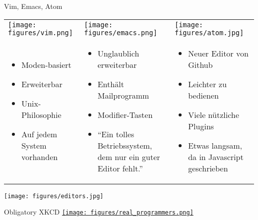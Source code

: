 \begin{frame}{Vim, Emacs, Atom}
  \begin{tabu}{@{} X[,C] @{} X[,C] @{} X[,C] @{}}
    \texttt{[image: figures/vim.png]} &
    \texttt{[image: figures/emacs.png]} &
    \texttt{[image: figures/atom.jpg]} \\
    \begin{itemize}
      \item Moden-basiert
      \item Erweiterbar
      \item Unix-Philosophie
      \item Auf jedem System vorhanden
    \end{itemize}
    &
    \begin{itemize}
      \item Unglaublich erweiterbar
      \item Enthält Mailprogramm
      \item Modifier-Tasten
      \item \enquote{Ein tolles Betriebssystem, dem nur ein guter Editor fehlt.}
    \end{itemize}
    &
    \begin{itemize}
      \item Neuer Editor von Github
      \item Leichter zu bedienen
      \item Viele nützliche Plugins
      \item Etwas langsam, da in Javascript geschrieben
    \end{itemize}
  \end{tabu}
\end{frame}

\begin{frame}
  \centering
  \texttt{[image: figures/editors.jpg]}
\end{frame}

\begin{frame}{Obligatory XKCD}
  \centering
  \href{http://xkcd.com/378/}{\texttt{[image: figures/real\_programmers.png]}}
\end{frame}
